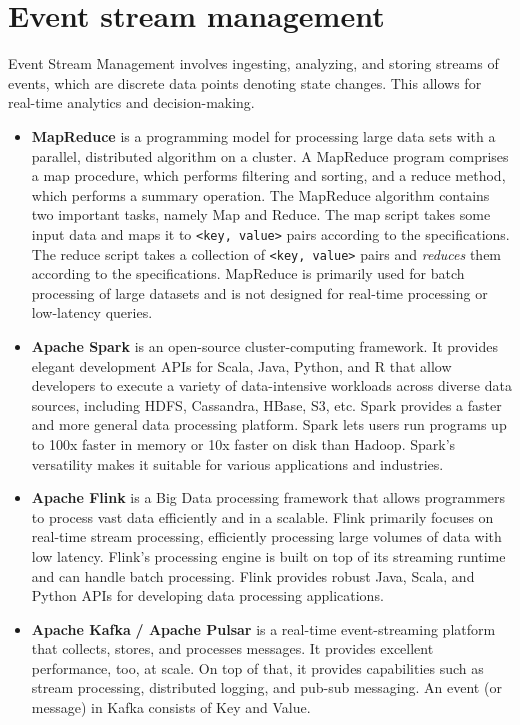 \chapter{Event stream management}
Event Stream Management involves ingesting, analyzing, and storing streams of events, which are discrete data points denoting state changes. This allows for real-time analytics and decision-making.

\begin{itemize}
    \item \textbf{MapReduce} \cite{hashem2016mapreduce} is a programming model for processing large data sets with a parallel, distributed algorithm on a cluster. A MapReduce program comprises a map procedure, which performs filtering and sorting, and a reduce method, which performs a summary operation. The MapReduce algorithm contains two important tasks, namely Map and Reduce. The map script takes some input data and maps it to \texttt{<key, value>} pairs according to the specifications. The reduce script takes a collection of \texttt{<key, value>} pairs and \textit{reduces} them according to the specifications. MapReduce is primarily used for batch processing of large datasets and is not designed for real-time processing or low-latency queries.

    \item \textbf{Apache Spark} \cite{10.1145/2783258.2789993} is an open-source cluster-computing framework. It provides elegant development APIs for Scala, Java, Python, and R that allow developers to execute a variety of data-intensive workloads across diverse data sources, including HDFS, Cassandra, HBase, S3, etc. Spark provides a faster and more general data processing platform. Spark lets users run programs up to 100x faster in memory or 10x faster on disk than Hadoop. Spark's versatility makes it suitable for various applications and industries.

    \item \textbf{Apache Flink} \cite{10.14778/3137765.3137777} is a Big Data processing framework that allows programmers to process vast data efficiently and in a scalable. Flink primarily focuses on real-time stream processing, efficiently processing large volumes of data with low latency. Flink's processing engine is built on top of its streaming runtime and can handle batch processing. Flink provides robust Java, Scala, and Python APIs for developing data processing applications.

    \item \textbf{Apache Kafka} \cite{10213406} \textbf{/ Apache Pulsar} \cite{Sharma2022pulsar} is a real-time event-streaming platform that collects, stores, and processes messages. It provides excellent performance, too, at scale. On top of that, it provides capabilities such as stream processing, distributed logging, and pub-sub messaging. An event (or message) in Kafka consists of Key and Value.
\end{itemize}

